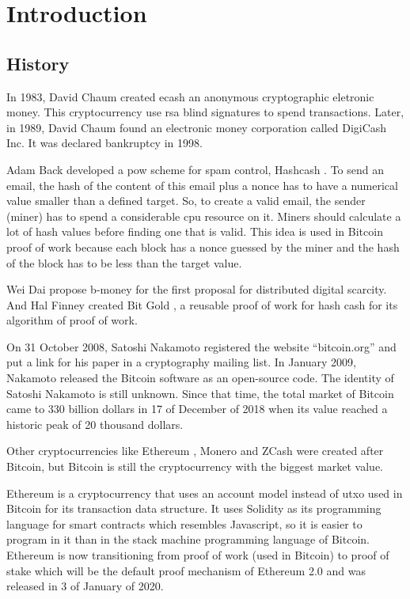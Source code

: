 \section{Introduction}

\subsection{History} 

In 1983, David Chaum created ecash \cite{panurach1996money} an anonymous cryptographic eletronic money.
This cryptocurrency use \gls{rsa} blind signatures \cite{chaum1983blind} to spend transactions.
Later, in 1989, David Chaum found an electronic money corporation called DigiCash Inc.
It was declared bankruptcy in 1998.

Adam Back developed a \gls{pow} scheme for spam control, Hashcash \cite{back2002hashcash}.
To send an email, the hash of the content of this email plus a nonce has to have a numerical value
smaller than a defined target.
So, to create a valid email, the sender (miner) has to spend a considerable \gls{cpu} resource on it.
Miners should calculate a lot of hash values before finding one that is valid.
This idea is used in Bitcoin proof of work because each block has a nonce guessed by the miner and
the hash of the block has to be less than the target value.

Wei Dai propose b-money \cite{dai1998b} for the first proposal for distributed digital scarcity.
And Hal Finney created Bit Gold \cite{wallace2011rise}, a reusable proof of work for hash cash for
its algorithm of proof of work.

On 31 October 2008, Satoshi Nakamoto registered the website ``bitcoin.org'' and put a link for his
paper \cite{nakamoto2008bitcoin} in a cryptography mailing list.
In January 2009, Nakamoto released the Bitcoin software as an open-source code.
The identity of Satoshi Nakamoto is still unknown.
Since that time, the total market of Bitcoin came to 330 billion dollars in 17 of December of 2018
when its value reached a historic peak of 20 thousand dollars.

Other cryptocurrencies like Ethereum \cite{wood2014ethereum}, Monero \cite{noether2015ring} and
ZCash \cite{hopwood2016zcash} were created after Bitcoin,
but Bitcoin is still the cryptocurrency with the biggest market value.

Ethereum is a cryptocurrency that uses an account model instead of \gls{utxo} used in Bitcoin for its
transaction data structure.
It uses Solidity as its programming language for smart contracts which resembles Javascript,
so it is easier to program in it than in the stack machine programming language of Bitcoin.
Ethereum is now transitioning from proof of work (used in Bitcoin) to proof of stake
which will be the default proof mechanism of Ethereum 2.0 and was released in
3 of January of 2020.


